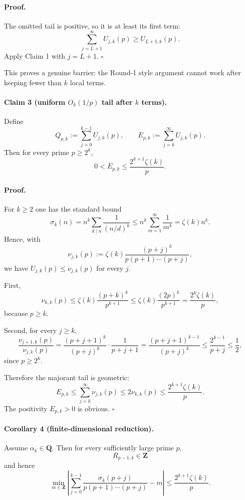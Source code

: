 \paragraph{Proof.}
The omitted tail is positive, so it is at least its first term:
\[
\sum_{j=L+1}^{\infty}U_{j,k}(p)\ge U_{L+1,k}(p).
\]
Apply Claim 1 with $j=L+1$.
\hfill$\square$

This proves a genuine barrier: the Round-1 style argument cannot work after keeping fewer than $k$ local terms.

\medskip

\paragraph{Claim 3 (uniform $O_k(1/p)$ tail after $k$ terms).}
Define
\[
Q_{p,k}:=\sum_{j=0}^{k-1}U_{j,k}(p),
\qquad
E_{p,k}:=\sum_{j=k}^{\infty}U_{j,k}(p).
\]
Then for every prime $p\ge 2^k$,
\[
0<E_{p,k}\le \frac{2^{k+1}\zeta(k)}{p}.
\]

\paragraph{Proof.}
For $k\ge 2$ one has the standard bound
\[
\sigma_k(n)=n^k\sum_{d\mid n}\frac1{(n/d)^k}
\le n^k\sum_{m=1}^{\infty}\frac1{m^k}
=\zeta(k)n^k.
\]
Hence, with
\[
\nu_{j,k}(p):=\zeta(k)\frac{(p+j)^k}{p(p+1)\cdots(p+j)},
\]
we have $U_{j,k}(p)\le \nu_{j,k}(p)$ for every $j$.

First,
\[
\nu_{k,k}(p)
\le \zeta(k)\frac{(p+k)^k}{p^{k+1}}
\le \zeta(k)\frac{(2p)^k}{p^{k+1}}
=\frac{2^k\zeta(k)}{p},
\]
because $p\ge k$.

Second, for every $j\ge k$,
\[
\frac{\nu_{j+1,k}(p)}{\nu_{j,k}(p)}
=\frac{(p+j+1)^k}{(p+j)^k}\cdot\frac1{p+j+1}
=\frac{(p+j+1)^{k-1}}{(p+j)^k}
\le \frac{2^{k-1}}{p+j}
\le \frac12,
\]
since $p\ge 2^k$.

Therefore the majorant tail is geometric:
\[
E_{p,k}
\le \sum_{j=k}^{\infty}\nu_{j,k}(p)
\le 2\nu_{k,k}(p)
\le \frac{2^{k+1}\zeta(k)}{p}.
\]
The positivity $E_{p,k}>0$ is obvious.
\hfill$\square$

\medskip

\paragraph{Corollary 4 (finite-dimensional reduction).}
Assume $\alpha_k\in\mathbf{Q}$. Then for every sufficiently large prime $p$,
\[
R_{p-1,k}\in\mathbf{Z}
\]
and hence
\[
\min_{m\in\mathbf{Z}}
\left|
\sum_{j=0}^{k-1}\frac{\sigma_k(p+j)}{p(p+1)\cdots(p+j)}-m
\right|
\le \frac{2^{k+1}\zeta(k)}{p}.
\]

